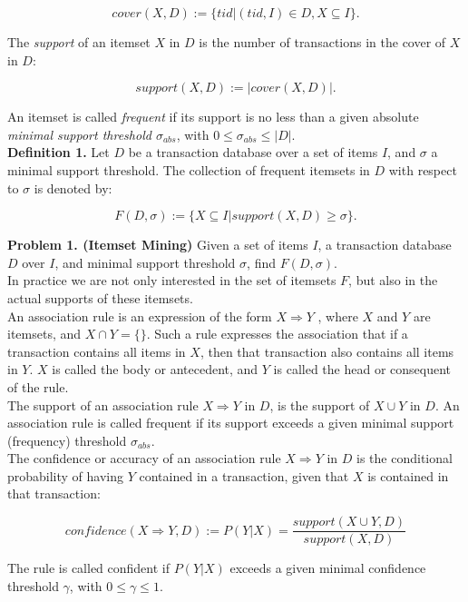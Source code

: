 \documentclass{article}
\begin{document}
\[cover(X, D) := \{tid | (tid, I) \in D, X \subseteq I\}. \]

The {\sl support} of an itemset $X$ in $D$ is the number of transactions in the cover of $X$ in $D$:

\[support(X, D) := |cover(X,D)|.\]

An itemset is called {\sl frequent} if its support is no less than a given absolute {\sl minimal support threshold $\sigma_{abs}$}, with  $0 \le \sigma_{abs} \le |D|$.\\

{\bf Definition 1.} Let $D$ be a transaction database over a set of items $I$, and $\sigma$ a minimal support threshold. The collection of frequent itemsets in $D$ with respect to $\sigma$ is denoted by: 

\[F(D,\sigma) := \{X \subseteq I | support(X, D) \ge \sigma\}.\]

{\bf Problem 1. (Itemset Mining)} Given a set of items $I$, a transaction database $D$ over $I$, and minimal support threshold $\sigma$, find $F(D, \sigma)$.\\

In practice we are not only interested in the set of itemsets $F$, but also
in the actual supports of these itemsets.\\

An association rule is an expression of the form $X \Rightarrow Y$ ,
where $X$ and $Y$ are itemsets, and $X \cap Y = \{\}$. Such a rule
expresses the association that if a transaction contains all items in
$X$, then that transaction also contains all items in $Y$. $X$ is called
the body or antecedent, and $Y$ is called the head or consequent of the
rule.\\

The support of an association rule $X \Rightarrow Y$ in $D$, is the
support of $X \cup Y$ in $D$. An association rule is called
frequent if its support exceeds a given minimal support
(frequency) threshold $\sigma_{abs}$. \\

The confidence or accuracy of an association rule $X \Rightarrow Y$ in
$D$ is the conditional probability of having $Y$ contained in a
transaction, given that $X$ is contained in that transaction:

\[confidence(X \Rightarrow Y, D) := P(Y|X) = \frac{support(X \cup Y, D)}{support(X,D)}\]

The rule is called confident if $P(Y|X)$ exceeds a given minimal confidence threshold $\gamma$, with $0 \le \gamma \le 1$. \\
\end{document}
